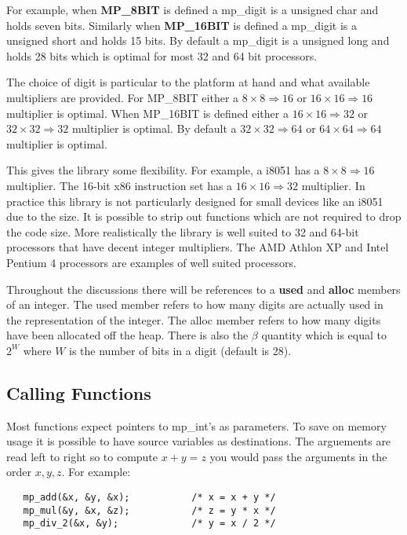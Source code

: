 \documentclass[]{article}
\begin{document}
For example, when \textbf{MP\_8BIT} is defined a mp\_digit is a unsigned char and holds seven bits.  Similarly 
when \textbf{MP\_16BIT} is defined a mp\_digit is a unsigned short and holds 15 bits.   By default a mp\_digit is a 
unsigned long and holds 28 bits which is optimal for most 32 and 64 bit processors.

The choice of digit is particular to the platform at hand and what available multipliers are provided.  For 
MP\_8BIT either a $8 \times 8 \Rightarrow 16$ or $16 \times 16 \Rightarrow 16$ multiplier is optimal.  When 
MP\_16BIT is defined either a $16 \times 16 \Rightarrow 32$ or $32 \times 32 \Rightarrow 32$ multiplier is optimal.  By
default a $32 \times 32 \Rightarrow 64$ or $64 \times 64 \Rightarrow 64$ multiplier is optimal.  

This gives the library some flexibility.  For example, a i8051 has a $8 \times 8 \Rightarrow 16$ multiplier.  The 
16-bit x86 instruction set has a $16 \times 16 \Rightarrow 32$ multiplier.  In practice this library is not particularly
designed for small devices like an i8051 due to the size.  It is possible to strip out functions which are not required 
to drop the code size.  More realistically the library is well suited to 32 and 64-bit processors that have decent
integer multipliers.  The AMD Athlon XP and Intel Pentium 4 processors are examples of well suited processors.

Throughout the discussions there will be references to a \textbf{used} and \textbf{alloc} members of an integer.  The
used member refers to how many digits are actually used in the representation of the integer.  The alloc member refers
to how many digits have been allocated off the heap.  There is also the $\beta$ quantity which is equal to $2^W$ where 
$W$ is the number of bits in a digit (default is 28).  

\subsection{Calling Functions}
Most functions expect pointers to mp\_int's as parameters.   To save on memory usage it is possible to have source
variables as destinations.  The arguements are read left to right so to compute $x + y = z$ you would pass the arguments
in the order $x, y, z$.  For example:
\begin{verbatim}
   mp_add(&x, &y, &x);           /* x = x + y */
   mp_mul(&y, &x, &z);           /* z = y * x */
   mp_div_2(&x, &y);             /* y = x / 2 */
\end{verbatim}
\end{document}
